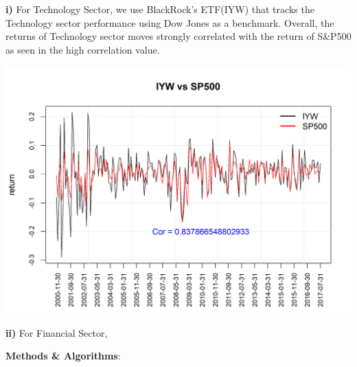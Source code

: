\documentclass[12pt]{amsart}
\begin{document}
\textbf{i)} For Technology Sector, we use BlackRock's ETF(IYW) that tracks the Technology sector performance using Dow Jones as a benchmark. Overall, the returns of Technology sector moves strongly correlated with the return of S\&P500 as seen in the high correlation value.
\begin{center}
	\includegraphics[scale=0.7]{IYW_vs_SP500}
\end{center}

\textbf{ii)} For Financial Sector,
\vskip 8pt \noindent


\vskip 8pt \noindent
{\textbf{Methods \& Algorithms}: }
\vskip 8pt \noindent
\end{document}
